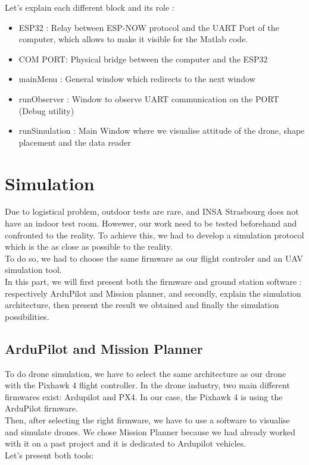 Let's explain each different block and its role : 

\begin{itemize}
    \item ESP32 : Relay between ESP-NOW protocol and the UART Port of the computer, which allows to make it visible for the Matlab code.
    \item COM PORT: Physical bridge between the computer and the ESP32
    \item mainMenu : General window which redirects to the next window
    \item runObserver : Window to observe UART communication on the PORT (Debug utility)
    \item runSimulation : Main Window where we visualise attitude of the drone, shape placement and the data reader
\end{itemize}

\newpage
\section{Simulation}
\label{Simulation}

Due to logistical problem, outdoor tests are rare, and INSA Strasbourg does not have an indoor test room. Howewer, our work need to be tested beforehand and confronted to the reality. To achieve this, we had to develop a simulation protocol which is the as close as possible to the reality. \\
To do so, we had to choose the same firmware as our flight controler and an UAV simulation tool. \\
In this part, we will first present both the firmware and ground station software : respectively ArduPilot and Mission planner, and secondly, explain the simulation architecture, then present the result we obtained and finally the simulation possibilities.

\subsection{ArduPilot and Mission Planner}

To do drone simulation, we have to select the same architecture as our drone with the Pixhawk 4 flight controller. In the drone industry, two main different firmwares exist: Ardupilot and PX4. In our case, the Pixhawk 4 is using the ArduPilot firmware. \\
Then, after selecting the right firmware, we have to use a software to visualise and simulate drones. We chose Mission Planner because we had already worked with it on a past project and it is dedicated to Ardupilot vehicles. \\
Let's present both tools:

